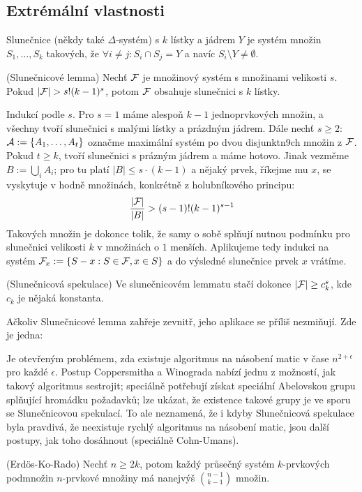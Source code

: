 \subsection{Extrémální vlastnosti}

\df Slunečnice (někdy také $\Delta$-systém) s $k$ lístky a jádrem $Y$ je systém 
množin $S_1, \dots, S_k$ takových, že $\forall i\neq j: S_i \cap S_j = Y$ a 
navíc $S_i \setminus Y \neq \emptyset$.

\vt (Slunečnicové lemma) Nechť $\mathcal{F}$ je množinový systém s množinami velikosti 
$s$.  Pokud $|\mathcal{F}| > s!  (k-1)^s$, potom $\mathcal{F}$ obsahuje slunečnici s $k$ lístky.

\dk Indukcí podle $s$. Pro $s=1$ máme alespoň $k-1$ jednoprvkových množin, a 
všechny tvoří slunečnici s malými lístky a prázdným jádrem. Dále nechť $s\geq 
2$: $\mathcal{A} := \{A_1, \dots, A_t\}$ označme maximální systém po dvou disjunktn9ch 
množin z $\mathcal{F}$. Pokud $t \geq k$, tvoří slunečnici s prázným jádrem a máme 
hotovo. Jinak vezměme $B := \bigcup_i A_i$; pro tu platí $|B| \leq s\cdot 
(k-1)$ a nějaký prvek, říkejme mu $x$, se vyskytuje v hodně množinách, 
konkrétně z holubníkového principu:
\begin{align*}
	{|\mathcal{F}| \over |B|} > (s-1)!(k-1)^{s-1}
\end{align*}
Takových množin je dokonce tolik, že samy o sobě splňují nutnou podmínku pro 
slunečnici velikosti $k$ v množinách o $1$ menších. Aplikujeme tedy indukci na 
systém $\mathcal{F}_x := \{S - x: S \in \mathcal{F}, x \in S\}$ a do výsledné slunečnice prvek 
$x$ vrátíme.

\vt (Slunečnicová spekulace) Ve slunečnicovém lemmatu stačí dokonce $|\mathcal{F}| \geq 
c_k^s$, kde $c_k$ je nějaká konstanta.

\pzn Ačkoliv Slunečnicové lemma zahřeje zevnitř, jeho aplikace se příliš 
nezmiňují. Zde je jedna:

Je otevřeným problémem, zda existuje algoritmus na násobení matic v čase 
$n^{2+\epsilon}$ pro každé $\epsilon$. Postup Coppersmitha a Winograda nabízí 
jednu z možností, jak takový algoritmus sestrojit; speciálně potřebují získat 
speciální Abelovskou grupu splňující hromádku požadavků; lze ukázat, že 
existence takové grupy je ve sporu se Slunečnicovou spekulací. To ale 
neznamená, že i kdyby Slunečnicová spekulace byla pravdivá, že neexistuje 
rychlý algoritmus na násobení matic, jsou další postupy, jak toho dosáhnout 
(speciálně Cohn-Umans).


\vt (Erdös-Ko-Rado) Nechť $n \geq 2k$, potom každý průsečný systém 
$k$-prvkových podmnožin $n$-prvkové množiny má nanejvýš $\binom{n-1}{k-1}$ 
množin.

